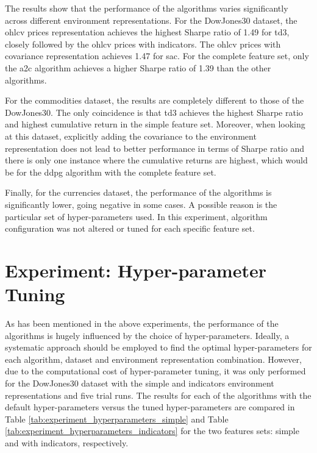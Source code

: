 

The results show that the performance of the algorithms varies significantly across different environment representations. For the DowJones30 dataset, the \acrshort{ohlcv} prices representation achieves the highest Sharpe ratio of 1.49 for \acrshort{td3}, closely followed by the \acrshort{ohlcv} prices with indicators. The \acrshort{ohlcv} prices with covariance representation achieves 1.47 for \acrshort{sac}. For the complete feature set, only the \acrshort{a2c} algorithm achieves a higher Sharpe ratio of 1.39 than the other algorithms.

For the commodities dataset, the results are completely different to those of the DowJones30. The only coincidence is that \acrshort{td3} achieves the highest Sharpe ratio and highest cumulative return in the simple feature set. Moreover, when looking at this dataset, explicitly adding the covariance to the environment representation does not lead to better performance in terms of Sharpe ratio and there is only one instance where the cumulative returns are highest, which would be for the \acrshort{ddpg} algorithm with the complete feature set.

Finally, for the currencies dataset, the performance of the algorithms is significantly lower, going negative in some cases. A possible reason is the particular set of hyper-parameters used. In this experiment, algorithm configuration was not altered or tuned for each specific feature set.

\section{Experiment: Hyper-parameter Tuning} \label{sec:hyper-parameter-tuning}

As has been mentioned in the above experiments, the performance of the algorithms is hugely influenced by the choice of hyper-parameters. Ideally, a systematic approach should be employed to find the optimal hyper-parameters for each algorithm, dataset and environment representation combination. However, due to the computational cost of hyper-parameter tuning, it was only performed for the DowJones30 dataset with the simple and indicators environment representations and five trial runs. The results for each of the algorithms with the default hyper-parameters versus the tuned hyper-parameters are compared in Table \ref{tab:experiment_hyperparameters_simple} and Table \ref{tab:experiment_hyperparameters_indicators} for the two features sets: simple and with indicators, respectively.

